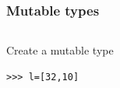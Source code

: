 \documentclass[colorlinks]{beamer}
\begin{document}
{

\begin{frame}[fragile]\frametitle{Mutable types}
\begin{columns}[T]
\begin{block}{Create a mutable type}
\begin{verbatim}
>>> l=[32,10]
\end{verbatim}

\end{block}
\end{columns}

\end{frame}
}
\end{document}
